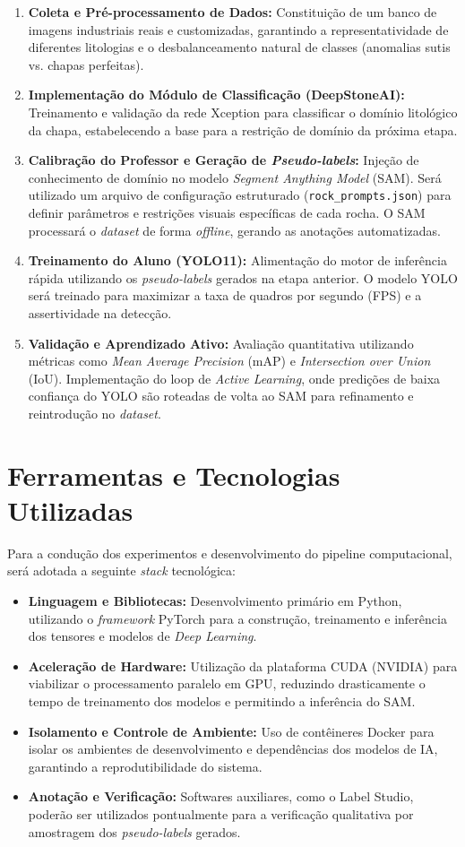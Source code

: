 \begin{enumerate}
    \item \textbf{Coleta e Pré-processamento de Dados:} Constituição de um banco de imagens industriais reais e customizadas, garantindo a representatividade de diferentes litologias e o desbalanceamento natural de classes (anomalias sutis vs. chapas perfeitas).
    \item \textbf{Implementação do Módulo de Classificação (DeepStoneAI):} Treinamento e validação da rede Xception para classificar o domínio litológico da chapa, estabelecendo a base para a restrição de domínio da próxima etapa.
    \item \textbf{Calibração do Professor e Geração de \textit{Pseudo-labels}:} Injeção de conhecimento de domínio no modelo \textit{Segment Anything Model} (SAM). Será utilizado um arquivo de configuração estruturado (\texttt{rock\_prompts.json}) para definir parâmetros e restrições visuais específicas de cada rocha. O SAM processará o \textit{dataset} de forma \textit{offline}, gerando as anotações automatizadas.
    \item \textbf{Treinamento do Aluno (YOLO11):} Alimentação do motor de inferência rápida utilizando os \textit{pseudo-labels} gerados na etapa anterior. O modelo YOLO será treinado para maximizar a taxa de quadros por segundo (FPS) e a assertividade na detecção.
    \item \textbf{Validação e Aprendizado Ativo:} Avaliação quantitativa utilizando métricas como \textit{Mean Average Precision} (mAP) e \textit{Intersection over Union} (IoU). Implementação do loop de \textit{Active Learning}, onde predições de baixa confiança do YOLO são roteadas de volta ao SAM para refinamento e reintrodução no \textit{dataset}.
\end{enumerate}

\section{Ferramentas e Tecnologias Utilizadas}
Para a condução dos experimentos e desenvolvimento do pipeline computacional, será adotada a seguinte \textit{stack} tecnológica:
\begin{itemize}
    \item \textbf{Linguagem e Bibliotecas:} Desenvolvimento primário em Python, utilizando o \textit{framework} PyTorch para a construção, treinamento e inferência dos tensores e modelos de \textit{Deep Learning}.
    \item \textbf{Aceleração de Hardware:} Utilização da plataforma CUDA (NVIDIA) para viabilizar o processamento paralelo em GPU, reduzindo drasticamente o tempo de treinamento dos modelos e permitindo a inferência do SAM.
    \item \textbf{Isolamento e Controle de Ambiente:} Uso de contêineres Docker para isolar os ambientes de desenvolvimento e dependências dos modelos de IA, garantindo a reprodutibilidade do sistema.
    \item \textbf{Anotação e Verificação:} Softwares auxiliares, como o Label Studio, poderão ser utilizados pontualmente para a verificação qualitativa por amostragem dos \textit{pseudo-labels} gerados.
\end{itemize}

